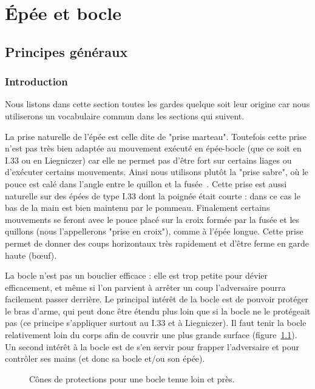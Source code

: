 \chapter{Épée et bocle}


\section{Principes généraux}


\subsection{Introduction}


Nous listons dans cette section toutes les gardes quelque soit leur origine car nous utiliserons un vocabulaire commun dans les sections qui suivent.

La prise naturelle de l'épée est celle dite de "prise marteau".
Toutefois cette prise n'est pas très bien adaptée au mouvement exécuté en épée-bocle (que ce soit en I.33 ou en Liegniczer) car elle ne permet pas d'être fort sur certains liages ou d'exécuter certains mouvements.
Ainsi nous utilisons plutôt la "prise sabre", où le pouce est calé dans l'angle entre le quillon et la fusée~\cite{fuhrmann:dijon:I33_liage:2015}.
Cette prise est aussi naturelle sur des épées de type I.33 dont la poignée était courte : dans ce cas le bas de la main est bien maintenu par le pommeau.
Finalement certains mouvements se feront avec le pouce placé sur la croix formée par la fusée et les quillons (nous l'appellerons "prise en croix"), comme à l'épée longue.
Cette prise permet de donner des coups horizontaux très rapidement et d'être ferme en garde haute (bœuf).

La bocle n'est pas un bouclier efficace : elle est trop petite pour dévier efficacement, et même si l'on parvient à arrêter un coup l'adversaire pourra facilement passer derrière.
Le principal intérêt de la bocle est de pouvoir protéger le bras d'arme, qui peut donc être étendu plus loin que si la bocle ne le protégeait pas (ce principe s'appliquer surtout au I.33 et à Liegniczer).
Il faut tenir la bocle relativement loin du corps afin de couvrir une plus grande surface (figure~\ref{épée-bocle:fig:bocle-cone}).
Un second intérêt à la bocle est de s'en servir pour frapper l'adversaire et pour contrôler ses mains (et donc sa bocle et/ou son épée).

\begin{figure}[ht]
	\centering
	\hspace{1cm}
	\caption{Cônes de protections pour une bocle tenue loin et près.}
	\label{épée-bocle:fig:bocle-cone}
\end{figure}


